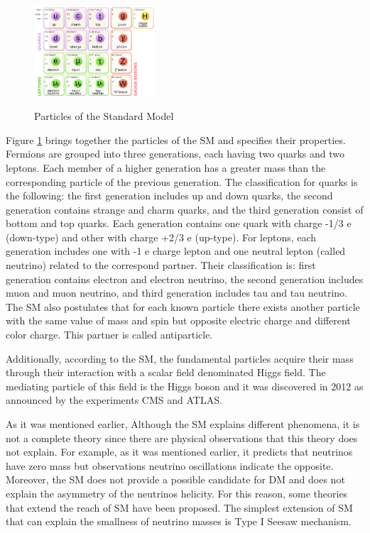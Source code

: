  \begin{figure}[h] 
 \centering
 \caption{Particles of the Standard Model}
 \includegraphics[width=0.4\textwidth]{./Capitulos/StateArt/standard_model} 
 \label{Estandar model}
 \end{figure} 

Figure \ref{Estandar model} brings together the particles of the SM and specifies their properties. Fermions are grouped into three generations, each having two quarks and two leptons. Each member of a higher generation has a greater mass than the corresponding particle of the previous generation. The classification for quarks is the following: the first generation includes up and down quarks, the second generation contains strange and charm quarks, and the third generation consist of bottom and top quarks. Each generation contains one quark with charge -1/3 e (down-type) and other with charge +2/3 e (up-type). For leptons, each generation includes one with -1 e charge lepton and one neutral lepton (called neutrino) related to the correspond partner. Their classification is: first generation contains electron and electron neutrino, the second generation includes muon and muon neutrino, and third generation includes tau and tau neutrino. The SM also postulates that for each known particle there exists another particle with the same value of mass and spin but opposite electric charge and different color charge. This partner is called antiparticle.

Additionally, according to the SM, the fundamental particles acquire their mass through their interaction with a scalar field denominated Higgs field. The mediating particle of this field is the Higgs boson and it was discovered in 2012 as announced by the experiments CMS and ATLAS. 

As it was mentioned earlier, Although the SM explains different phenomena, it is not a complete theory since there are physical observations that this theory does not explain. For example, as it was mentioned earlier, it predicts that neutrinos have zero mass but observations neutrino oscillations indicate the opposite. Moreover, the SM does not provide a possible candidate for DM and does not explain the asymmetry of the neutrinos helicity. For this reason, some theories that extend the reach of SM have been proposed. The simplest extension of SM that can explain the smallness of neutrino masses is Type I Seesaw mechanism. 

